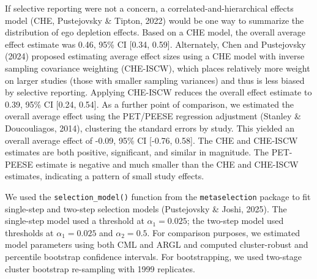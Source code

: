 \documentclass[
  american,
  man, donotrepeattitle,floatsintext]{apa7}
\begin{document}
If selective reporting were not a concern, a correlated-and-hierarchical effects model (CHE, Pustejovsky \& Tipton, 2022) would be one way to summarize the distribution of ego depletion effects.
Based on a CHE model, the overall average effect estimate was 0.46, 95\% CI {[}0.34, 0.59{]}.
Alternately, Chen and Pustejovsky (2024) proposed estimating average effect sizes using a CHE model with inverse sampling covariance weighting (CHE-ISCW), which places relatively more weight on larger studies (those with smaller sampling variances) and thus is less biased by selective reporting.
Applying CHE-ISCW reduces the overall effect estimate to 0.39, 95\% CI {[}0.24, 0.54{]}.
As a further point of comparison, we estimated the overall average effect using the PET/PEESE regression adjustment (Stanley \& Doucouliagos, 2014), clustering the standard errors by study. This yielded an overall average effect of -0.09, 95\% CI {[}-0.76, 0.58{]}. The CHE and CHE-ISCW estimates are both positive, significant, and similar in magnitude. The PET-PEESE estimate is negative and much smaller than the CHE and CHE-ISCW estimates, indicating a pattern of small study effects.

We used the \texttt{selection\_model()} function from the \texttt{metaselection} package to fit single-step and two-step selection models (Pustejovsky \& Joshi, 2025).
The single-step model used a threshold at \(\alpha_1 = 0.025\); the two-step model used thresholds at \(\alpha_1 = 0.025\) and \(\alpha_2 = 0.5\).
For comparison purposes, we estimated model parameters using both CML and ARGL and computed cluster-robust and percentile bootstrap confidence intervals.
For bootstrapping, we used two-stage cluster bootstrap re-sampling with 1999 replicates.
\end{document}
